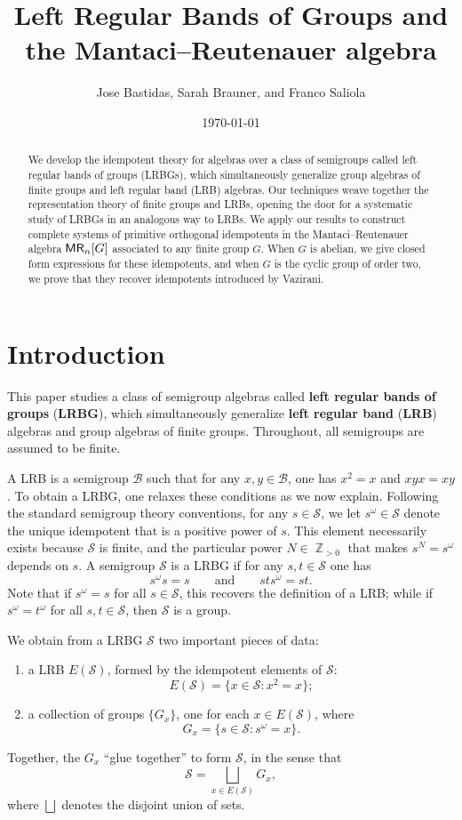 \documentclass[11pt, oneside, reqno]{amsart}
\date{\today}
\title[Left Regular Bands of Groups and the Mantaci--Reutenauer algebra]{Left Regular Bands of Groups and \\ the Mantaci--Reutenauer algebra}
\author{Jose Bastidas, Sarah Brauner, and Franco Saliola}
\theoremstyle{definition}
\numberwithin{equation}{section}
\DeclareMathOperator{\Z}{\mathbb{Z}}
\newcommand{\defn}[1]{{\color{RoyalBlue}\bf#1}}
\def \BB{{\mathcal{B}}}
\def \MR {{\sf{MR}}}
\def \SS{{\mathcal{S}}}
\def\qqand{\qquad\text{and}\qquad}
\begin{document}
\begin{abstract}
We develop the idempotent theory for algebras over a class of semigroups called
left regular bands of groups (LRBGs), which simultaneously generalize group
algebras of finite groups and left regular band (LRB) algebras.  Our techniques
weave together the representation theory of finite groups and
LRBs, opening the door for a systematic study of LRBGs in an
analogous way to LRBs. We apply our results to construct complete systems of
primitive orthogonal idempotents in the Mantaci--Reutenauer algebra $\MR_n[G]$
associated to any finite group $G$. When $G$ is abelian, we give closed form
expressions for these idempotents, and when $G$ is the cyclic group of order
two, we prove that they recover idempotents introduced by Vazirani.
\end{abstract}

\maketitle

\section{Introduction}
This paper studies a class of semigroup algebras called \defn{left regular
bands of groups} (\defn{LRBG}), which simultaneously generalize \defn{left
regular band} (\defn{LRB}) algebras and group algebras of finite groups. Throughout, all semigroups are assumed to be finite.

A LRB is a semigroup $\BB$ such that for any $x,y \in \BB$, one has $x^2 = x$ and $xyx= xy$.
To obtain a LRBG, one relaxes these conditions as we now explain.
Following the standard semigroup theory conventions, for any $s \in \SS$, we let $s^{\omega} \in \SS$ denote the unique idempotent that is a positive power of $s$.
This element necessarily exists because $\SS$ is finite, and the particular power $N \in \Z_{> 0}$ that makes $s^N = s^\omega$ depends on $s$.
A semigroup $\SS$ is a LRBG if for any $s,t \in \SS$ one has
\[ s^{\omega}s = s \qqand st s^{\omega} = st.\]
Note that if $s^\omega = s$ for all $s \in \SS$, this recovers the definition of a LRB;
while if $s^{\omega} = t^{\omega}$ for all $s,t \in \SS$, then $\SS$ is a group.

We obtain from a LRBG $\SS$ two important pieces of data:
\begin{enumerate}
    \item a LRB $E(\SS)$, formed by the idempotent elements of $\SS$:
    \[ E(\SS)= \{ x \in \SS: x^2 = x \};\]
    \item a collection of groups $\{ G_{x} \}$, one for each $x \in E(\SS)$, where 
    \[G_x = \{ s \in \SS : s^\omega = x \}. \]
\end{enumerate}
Together, the $G_x$ ``glue together'' to form $\SS$, in the sense that 
\[
    \SS = \bigsqcup_{x \in E(\SS)} G_x,
\]
where $\bigsqcup$ denotes the disjoint union of sets.
\end{document}
